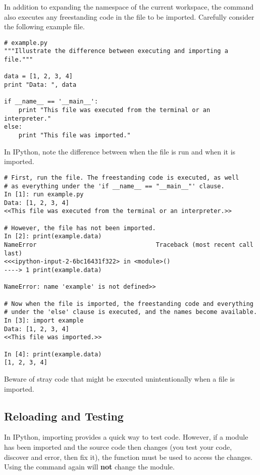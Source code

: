 
In addition to expanding the namespace of the current workspace, the  command also executes any freestanding code in the file to be imported.
Carefully consider the following example file.

\begin{lstlisting}
# example.py
"""Illustrate the difference between executing and importing a file."""

data = [1, 2, 3, 4]
print "Data: ", data

if __name__ == '__main__':
    print "This file was executed from the terminal or an interpreter."
else:
    print "This file was imported."
\end{lstlisting}

In IPython, note the difference between when the file is run and when it is imported.

\begin{lstlisting}
# First, run the file. The freestanding code is executed, as well
# as everything under the 'if __name__ == "__main__"' clause.
In [1]: run example.py
Data: [1, 2, 3, 4]
<<This file was executed from the terminal or an interpreter.>>

# However, the file has not been imported.
In [2]: print(example.data)
NameError                                 Traceback (most recent call last)
<<<ipython-input-2-6bc16431f322> in <module>()
----> 1 print(example.data)

NameError: name 'example' is not defined>>

# Now when the file is imported, the freestanding code and everything
# under the 'else' clause is executed, and the names become available.
In [3]: import example
Data: [1, 2, 3, 4]
<<This file was imported.>>

In [4]: print(example.data)
[1, 2, 3, 4]
\end{lstlisting}

Beware of stray code that might be executed unintentionally when a file is imported.

\subsection*{Reloading and Testing}

In IPython, importing provides a quick way to test code.
However, if a module has been imported and the source code then changes (you test your code, discover and error, then fix it), the  function must be used to access the changes.
Using the  command again will \textbf{not} change the module.

